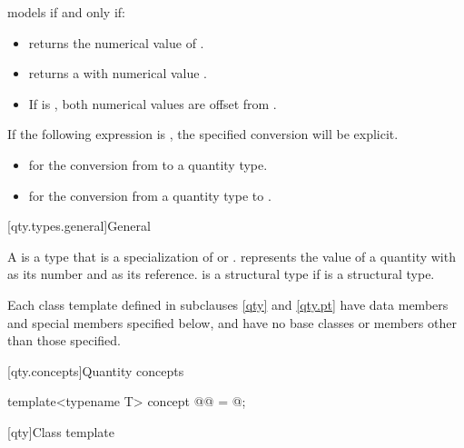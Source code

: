\pnum
{} models  if and only if:
\begin{itemize}
\item
{} returns the numerical value of .
\item
{} returns a  with numerical value .
\item
If  is ,
both numerical values are offset from .
\end{itemize}

\pnum
If the following expression is , the specified conversion will be explicit.
\begin{itemize}
\item
{} for the conversion from  to a quantity type.
\item
{} for the conversion from a quantity type to .
\end{itemize}

[qty.types.general]{General}

\pnum
\label{term.quantity.type}
A 
is a type 
that is a specialization of  or .
 represents the value of a quantity
with  as its number
and  as its reference.
 is a structural type
if  is a structural type.

\pnum
Each class template defined in subclauses \ref{qty} and \ref{qty.pt}
have data members and special members specified below, and
have no base classes or members other than those specified.

[qty.concepts]{Quantity concepts}

\begin{itemdecl}
template<typename T>
concept @@ = @\unspecnc@;
\end{itemdecl}

[qty]{Class template }

